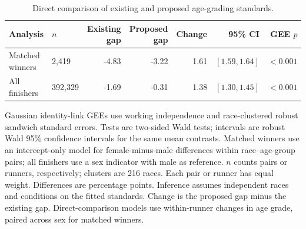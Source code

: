 \documentclass[11pt]{article}
\begin{document}
\begin{table}[htbp]
\centering
\small
\caption{Direct comparison of existing and proposed age-grading standards.}
\label{tab:method-comparison}
\setlength{\tabcolsep}{4pt}
\begin{tabular}{llrrrrr}
\toprule
Analysis & $n$ & Existing gap & Proposed gap & Change & 95\% CI & GEE $p$ \\
\midrule
Matched winners & 2,419 & -4.83 & -3.22 & 1.61 & $[1.59, 1.64]$ & $<0.001$ \\
All finishers & 392,329 & -1.69 & -0.31 & 1.38 & $[1.30, 1.45]$ & $<0.001$ \\
\bottomrule
\end{tabular}
\par\medskip
\begin{minipage}{\textwidth}
\footnotesize
Gaussian identity-link GEEs use working independence and race-clustered robust sandwich standard errors. Tests are two-sided Wald tests; intervals are robust Wald 95\% confidence intervals for the same mean contrasts. Matched winners use an intercept-only model for female-minus-male differences within race--age-group pairs; all finishers use a sex indicator with male as reference. $n$ counts pairs or runners, respectively; clusters are 216 races. Each pair or runner has equal weight. Differences are percentage points. Inference assumes independent races and conditions on the fitted standards. Change is the proposed gap minus the existing gap. Direct-comparison models use within-runner changes in age grade, paired across sex for matched winners.
\end{minipage}
\end{table}
\end{document}
